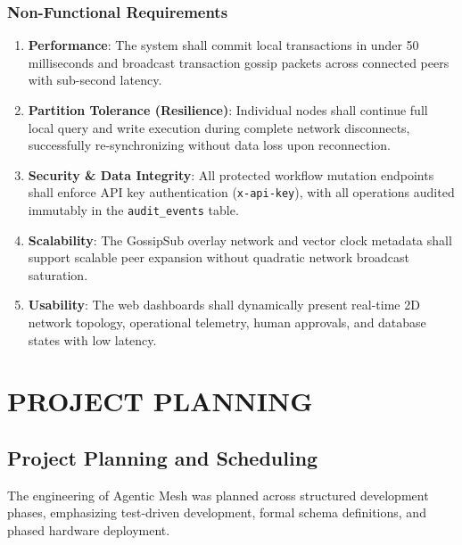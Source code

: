 \documentclass[12pt,a4paper]{report}
\begin{document}
\subsection{Non-Functional Requirements}
\begin{enumerate}[label=\roman*.,leftmargin=*,itemsep=3pt]
    \item \textbf{Performance}: The system shall commit local transactions in under 50 milliseconds and broadcast transaction gossip packets across connected peers with sub-second latency.
    \item \textbf{Partition Tolerance (Resilience)}: Individual nodes shall continue full local query and write execution during complete network disconnects, successfully re-synchronizing without data loss upon reconnection.
    \item \textbf{Security \& Data Integrity}: All protected workflow mutation endpoints shall enforce API key authentication (\texttt{x-api-key}), with all operations audited immutably in the \texttt{audit\_events} table.
    \item \textbf{Scalability}: The GossipSub overlay network and vector clock metadata shall support scalable peer expansion without quadratic network broadcast saturation.
    \item \textbf{Usability}: The web dashboards shall dynamically present real-time 2D network topology, operational telemetry, human approvals, and database states with low latency.
\end{enumerate}

\chapter{PROJECT PLANNING}

\section{Project Planning and Scheduling}
The engineering of Agentic Mesh was planned across structured development phases, emphasizing test-driven development, formal schema definitions, and phased hardware deployment.
\end{document}
